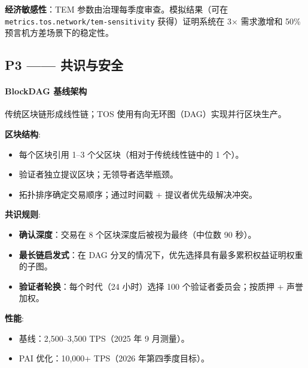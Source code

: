\documentclass[11pt]{article}
\begin{document}
\textbf{经济敏感性}：TEM 参数由治理每季度审查。模拟结果（可在 \texttt{metrics.tos.network/tem-sensitivity} 获得）证明系统在 3$\times$ 需求激增和 50\% 预言机方差场景下的稳定性。

\subsection{P3 —— 共识与安全}
\label{sec:pillar-consensus}

\paragraph{BlockDAG 基线架构}
传统区块链形成线性链；TOS 使用有向无环图（DAG）实现并行区块生产。

\textbf{区块结构}:
\begin{itemize}[noitemsep]
  \item 每个区块引用 1--3 个父区块（相对于传统线性链中的 1 个）。
  \item 验证者独立提议区块；无领导者选举瓶颈。
  \item 拓扑排序确定交易顺序；通过时间戳 + 提议者优先级解决冲突。
\end{itemize}

\textbf{共识规则}:
\begin{itemize}[noitemsep]
  \item \textbf{确认深度}：交易在 8 个区块深度后被视为最终（中位数 90 秒）。
  \item \textbf{最长链启发式}：在 DAG 分叉的情况下，优先选择具有最多累积权益证明权重的子图。
  \item \textbf{验证者轮换}：每个时代（24 小时）选择 100 个验证者委员会；按质押 + 声誉加权。
\end{itemize}

\textbf{性能}:
\begin{itemize}[noitemsep]
  \item 基线：2,500--3,500 TPS（2025 年 9 月测量）。
  \item PAI 优化：10,000+ TPS（2026 年第四季度目标）。
\end{itemize}
\end{document}

